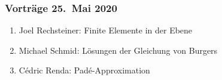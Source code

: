 %
%
%



\begin{frame}
\frametitle{Vorträge 25.~Mai 2020}
\begin{enumerate}
\item<2->
Joel Rechsteiner: Finite Elemente in der Ebene
\bigskip

\item<3->
Michael Schmid: Lösungen der Gleichung von Burgers
\bigskip

\item<4->
Cédric Renda: Padé-Approximation

\end{enumerate}
\end{frame}


